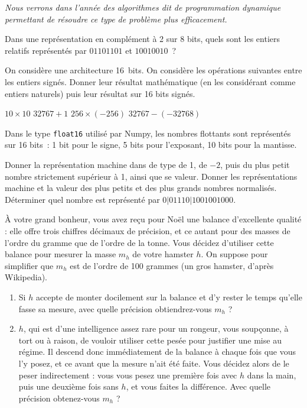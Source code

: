 \documentclass{magnolia}
\begin{document}
\emph{Nous verrons dans l'année des algorithmes dit de \og programmation dynamique \fg
permettant de résoudre ce type de problème plus efficacement.}


Dans une représentation en complément à 2 sur 8 bits, quels sont les entiers relatifs
représentés par $01101101$ et $10010010$~?

On considère une architecture 16~bits. On considère les opérations
suivantes entre les entiers signés. Donner leur résultat mathématique
(en les considérant comme entiers naturels) puis leur résultat sur
16 bits signés.
\begin{questions}
\question $10\times 10$
\question $32767+1$
\question $256 \times (-256)$
\question $32767 - (-32768)$
\end{questions}


Dans le type \verb!float16! utilisé par Numpy, les nombres flottants sont représentés
sur 16 bits~: 1 bit pour le signe, 5 bits pour l'exposant, 10 bits pour la mantisse.
\begin{questions}
\question Donner la représentation machine dans de type de 1, de $-2$, puis du plus petit
  nombre strictement supérieur à 1, ainsi que se valeur.
\question Donner les représentations machine et la valeur des plus petits et des plus grands
  nombres normalisés.
\question Déterminer quel nombre est représenté par $0|01110|1001001000$.
\end{questions}


  À votre grand bonheur, vous avez reçu pour Noël une balance d'excellente
  qualité : elle offre trois chiffres décimaux de précision, et ce autant
  pour des masses de l'ordre du gramme que de l'ordre de la tonne. Vous
  décidez d'utiliser cette balance pour mesurer la masse $m_h$ de votre
  hamster $h$. On suppose pour simplifier que $m_h$ est de l'ordre de
  100 grammes (un gros hamster, d'après Wikipedia).
  \begin{enumerate}
    \item Si $h$ accepte de monter docilement sur la balance et d'y rester
    le temps qu'elle fasse sa mesure, avec quelle précision obtiendrez-vous
    $m_h$ ?
    \item $h$, qui est d'une intelligence assez rare pour un rongeur,
    vous soupçonne, à tort ou à raison, de vouloir utiliser cette pesée pour
    justifier une mise au régime. Il descend donc immédiatement de la balance
    à chaque fois que vous l'y posez, et ce avant que la mesure n'ait été
    faite. Vous décidez alors de le peser indirectement : vous vous pesez une
    première fois avec $h$ dans la main, puis une deuxième fois sans $h$,
    et vous faites la différence. Avec quelle précision obtenez-vous $m_h$ ?
  \end{enumerate}
\end{document}

